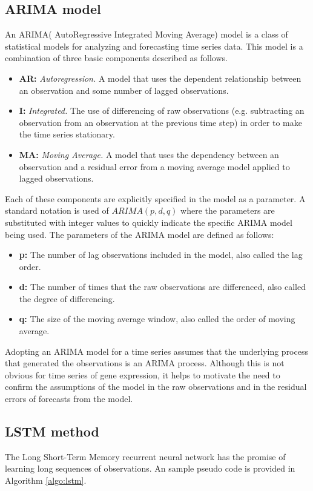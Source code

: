 \subsection{ARIMA model}
An ARIMA( AutoRegressive Integrated Moving Average) \cite{arima} model is a class of statistical models for analyzing and forecasting time series data. This model is a combination of three basic components described as follows.
\begin{itemize}
    \item \textbf{AR:} \textit{Autoregression.} A model that uses the dependent relationship between an observation and some number of lagged observations.
    \item \textbf{I:} \textit{Integrated.} The use of differencing of raw observations (e.g. subtracting an observation from an observation at the previous time step) in order to make the time series stationary.
    \item \textbf{MA:} \textit{Moving Average.} A model that uses the dependency between an observation and a residual error from a moving average model applied to lagged observations.
\end{itemize}
Each of these components are explicitly specified in the model as a parameter. A standard notation is used of $ARIMA(p,d,q)$ where the parameters are substituted with integer values to quickly indicate the specific ARIMA model being used. The parameters of the ARIMA model are defined as follows:
\begin{itemize}
    \item \textbf{p:} The number of lag observations included in the model, also called the lag order.
    \item \textbf{d:} The number of times that the raw observations are differenced, also called the degree of differencing.
    \item \textbf{q:} The size of the moving average window, also called the order of moving average.
\end{itemize}

Adopting an ARIMA model for a time series assumes that the underlying process that generated the observations is an ARIMA process. Although this is not obvious for time series of gene expression, it helps to motivate the need to confirm the assumptions of the model in the raw observations and in the residual errors of forecasts from the model.

\subsection{LSTM method}
The Long Short-Term Memory recurrent neural network \cite{lstm} has the promise of learning long sequences of observations. An sample pseudo code is provided in Algorithm \ref{algo:lstm}.  

